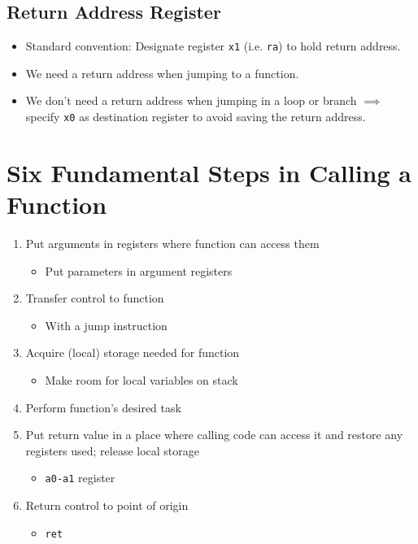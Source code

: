 \subsection{Return Address Register}
\begin{itemize}
    \item Standard convention: Designate register \texttt{x1} (i.e. \texttt{ra}) to hold return address.
    \item We need a return address when jumping to a function.
    \item We don't need a return address when jumping in a loop or branch $\implies$ specify \texttt{x0} as destination register to avoid saving the return address.
\end{itemize}

\section{Six Fundamental Steps in Calling a Function}
\begin{enumerate}
    \item Put arguments in registers where function can access them
        \begin{itemize}
            \item Put parameters in argument registers
        \end{itemize}
    \item Transfer control to function
        \begin{itemize}
            \item With a jump instruction
        \end{itemize}
    \item Acquire (local) storage needed for function
        \begin{itemize}
            \item Make room for local variables on stack
        \end{itemize}
    \item Perform function's desired task
    \item Put return value in a place where calling code can access it and restore any registers used; release local storage
        \begin{itemize}
            \item \texttt{a0-a1} register
        \end{itemize}
    \item Return control to point of origin
        \begin{itemize}
            \item \texttt{ret}
        \end{itemize}
\end{enumerate}


